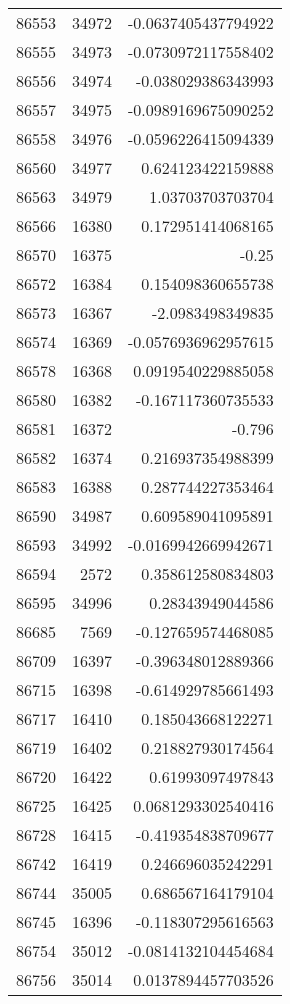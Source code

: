 \begin{tabular}{r | r | r}
86553 & 34972 & -0.0637405437794922 \\
86555 & 34973 & -0.0730972117558402 \\
86556 & 34974 & -0.038029386343993 \\
86557 & 34975 & -0.0989169675090252 \\
86558 & 34976 & -0.0596226415094339 \\
86560 & 34977 & 0.624123422159888 \\
86563 & 34979 & 1.03703703703704 \\
86566 & 16380 & 0.172951414068165 \\
86570 & 16375 & -0.25 \\
86572 & 16384 & 0.154098360655738 \\
86573 & 16367 & -2.0983498349835 \\
86574 & 16369 & -0.0576936962957615 \\
86578 & 16368 & 0.0919540229885058 \\
86580 & 16382 & -0.167117360735533 \\
86581 & 16372 & -0.796 \\
86582 & 16374 & 0.216937354988399 \\
86583 & 16388 & 0.287744227353464 \\
86590 & 34987 & 0.609589041095891 \\
86593 & 34992 & -0.0169942669942671 \\
86594 & 2572 & 0.358612580834803 \\
86595 & 34996 & 0.28343949044586 \\
86685 & 7569 & -0.127659574468085 \\
86709 & 16397 & -0.396348012889366 \\
86715 & 16398 & -0.614929785661493 \\
86717 & 16410 & 0.185043668122271 \\
86719 & 16402 & 0.218827930174564 \\
86720 & 16422 & 0.61993097497843 \\
86725 & 16425 & 0.0681293302540416 \\
86728 & 16415 & -0.419354838709677 \\
86742 & 16419 & 0.246696035242291 \\
86744 & 35005 & 0.686567164179104 \\
86745 & 16396 & -0.118307295616563 \\
86754 & 35012 & -0.0814132104454684 \\
86756 & 35014 & 0.0137894457703526 \\

\end{tabular}
